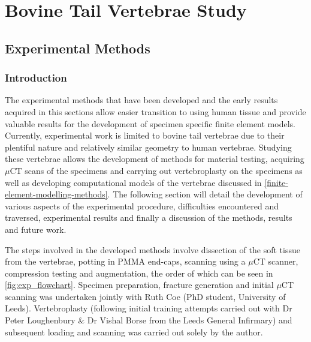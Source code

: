 \chapter{Bovine Tail Vertebrae Study}\label{chap_bov}

\section{Experimental Methods}\label{experimental-methods}

\subsection{Introduction}

The experimental methods that have been developed and the early results acquired in this sections allow easier transition to using human tissue  and provide valuable results for the development of specimen specific finite element models. Currently, experimental work is limited to bovine tail vertebrae due to their plentiful nature and relatively similar geometry to human vertebrae. Studying these vertebrae allows the development of methods for material testing, acquiring $\mu$CT scans of the specimens and carrying out vertebroplasty on the specimens as well as developing computational models of the vertebrae discussed in \cref{finite-element-modelling-methods}. The following section will detail the development of various aspects of the experimental procedure, difficulties encountered and traversed, experimental results and finally a discussion of the methods, results and future work.

The steps involved in the developed methods involve dissection of the soft tissue from the vertebrae, potting in PMMA end-caps, scanning using a $\mu$CT scanner, compression testing and augmentation, the order of which can be seen in \cref{fig:exp_flowchart}.
Specimen preparation, fracture generation and initial $\mu$CT scanning was undertaken jointly with Ruth Coe (PhD student, University of Leeds). Vertebroplasty (following initial training attempts carried out with Dr Peter Loughenbury \& Dr Vishal Borse from the Leeds General Infirmary) and subsequent loading and scanning was carried out solely by the author.

